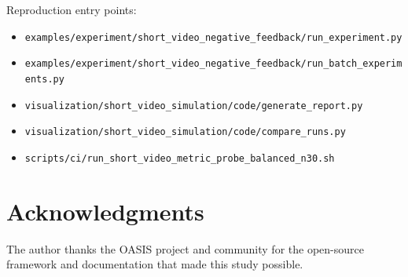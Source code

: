 \documentclass[11pt]{article}
\begin{document}
Reproduction entry points:
\begin{itemize}
\item \texttt{examples/experiment/short\_video\_negative\_feedback/run\_experiment.py}
\item \texttt{examples/experiment/short\_video\_negative\_feedback/run\_batch\_experiments.py}
\item \texttt{visualization/short\_video\_simulation/code/generate\_report.py}
\item \texttt{visualization/short\_video\_simulation/code/compare\_runs.py}
\item \texttt{scripts/ci/run\_short\_video\_metric\_probe\_balanced\_n30.sh}
\end{itemize}

\section*{Acknowledgments}
The author thanks the OASIS project and community for the open-source framework
and documentation that made this study possible.



\end{document}
